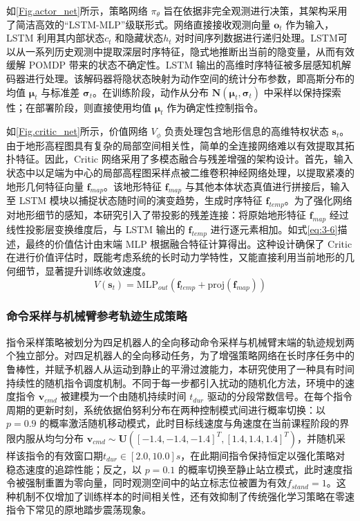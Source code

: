 如\autoref{Fig.actor_net}所示，策略网络 $\pi_\theta$ 旨在依据非完全观测进行决策，其架构采用了简洁高效的“LSTM-MLP”级联形式。网络直接接收观测向量 $\mathbf{o}_t$ 作为输入，LSTM 利用其内部状态$c_t$ 和隐藏状态$h_t$ 对时间序列数据进行递归处理。LSTM可以从一系列历史观测中提取深层时序特征，隐式地推断出当前的隐变量，从而有效缓解 POMDP 带来的状态不确定性\cite{hausknecht2017deeprecurrentqlearningpartially}。LSTM 输出的高维时序特征被多层感知机解码器进行处理。该解码器将隐状态映射为动作空间的统计分布参数，即高斯分布的均值 $\boldsymbol{\mu}_t$ 与标准差 $\boldsymbol{\sigma}_t$。在训练阶段，动作从分布 $\mathbf{N}(\boldsymbol{\mu}_t, \boldsymbol{\sigma}_t)$ 中采样以保持探索性；在部署阶段，则直接使用均值 $\boldsymbol{\mu}_t$ 作为确定性控制指令。

如\autoref{Fig.critic_net}所示，价值网络 $V_\phi$ 负责处理包含地形信息的高维特权状态 $\mathbf{s}_t$。由于地形高程图具有复杂的局部空间相关性，简单的全连接网络难以有效提取其拓扑特征。因此，Critic 网络采用了多模态融合与残差增强的架构设计。首先，输入状态中以足端为中心的局部高程图采样点被二维卷积神经网络处理，以提取紧凑的地形几何特征向量 $\mathbf{f}_{map}$。该地形特征 $\mathbf{f}_{map}$ 与其他本体状态真值进行拼接后，输入至 LSTM 模块以捕捉状态随时间的演变趋势，生成时序特征 $\mathbf{f}_{temp}$。为了强化网络对地形细节的感知，本研究引入了带投影的残差连接：将原始地形特征 $\mathbf{f}_{map}$ 经过线性投影层变换维度后，与 LSTM 输出的 $\mathbf{f}_{temp}$ 进行逐元素相加。如式\eqref{eq:3-6}描述，最终的价值估计由末端 MLP 根据融合特征计算得出。这种设计确保了 Critic 在进行价值评估时，既能考虑系统的长时动力学特性，又能直接利用当前地形的几何细节，显著提升训练收敛速度。
\begin{equation} \label{eq:3-6}
    V(\mathbf{s}_t) = \text{MLP}_{out}\left(\mathbf{f}_{temp} + \text{proj}(\mathbf{f}_{map})\right)
\end{equation}

\subsubsection{命令采样与机械臂参考轨迹生成策略}

指令采样策略被划分为四足机器人的全向移动命令采样与机械臂末端的轨迹规划两个独立部分。对四足机器人的全向移动任务，为了增强策略网络在长时序任务中的鲁棒性，并赋予机器人从运动到静止的平滑过渡能力，本研究使用了一种具有时间持续性的随机指令调度机制。不同于每一步都引入扰动的随机化方法，环境中的速度指令 $\mathbf{v}_{cmd}$ 被建模为一个由随机持续时间 $t_{dur}$ 驱动的分段常数信号。在每个指令周期的更新时刻，系统依据伯努利分布在两种控制模式间进行概率切换：以 $p=0.9$ 的概率激活随机移动模式，此时目标线速度与角速度在当前课程阶段的界限内服从均匀分布 $\mathbf{v}_{cmd} \sim \mathbf{U}([-1.4, -1.4, -1.4]^T, [1.4, 1.4, 1.4]^T)$，并随机采样该指令的有效窗口期$t_{dur} \in [2.0, 10.0]s$，在此期间指令保持恒定以强化策略对稳态速度的追踪性能；反之，以 $p=0.1$ 的概率切换至静止站立模式，此时速度指令被强制重置为零向量，同时观测空间中的站立标志位被置为有效$f_{stand}=1$。这种机制不仅增加了训练样本的时间相关性，还有效抑制了传统强化学习策略在零速指令下常见的原地踏步震荡现象。

